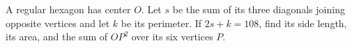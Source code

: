 A regular hexagon has center $O$. Let $s$ be the sum of its three diagonals joining opposite vertices and let $k$ be its perimeter. If $2s+k=108$, find its side length, its area, and the sum of $OP^2$ over its six vertices $P$.
